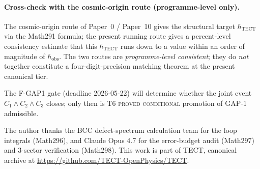 \paragraph{Cross-check with the cosmic-origin route (programme-level
only).}
The cosmic-origin route of Paper~0 / Paper~10 gives the structural
target $\hbar_{\mathrm{TECT}}$ via the Math291 formula; the present
running route gives a percent-level consistency estimate that this
$\hbar_{\mathrm{TECT}}$ runs down to a value within an order of
magnitude of $\hbar_{\mathrm{obs}}$. The two routes are
\emph{programme-level consistent}; they do \emph{not} together
constitute a four-digit-precision matching theorem at the present
canonical tier.

The F-GAP1 gate (deadline 2026-05-22) will determine whether the
joint event $C_1 \wedge C_2 \wedge C_3$ closes; only then is
T6 \textsc{proved conditional} promotion of GAP-1 admissible.

\begin{acknowledgments}
The author thanks the BCC defect-spectrum calculation team for the loop
integrals (Math296), and Claude Opus 4.7 for the error-budget audit (Math297)
and 3-sector verification (Math298). This work is part of TECT, canonical
archive at \url{https://github.com/TECT-OpenPhysics/TECT}.
\end{acknowledgments}





